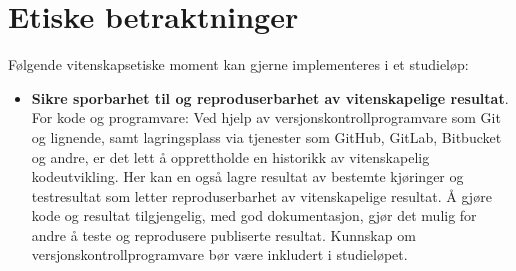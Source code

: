 \documentclass{article}
\begin{document}
\section{Etiske betraktninger}
Følgende vitenskapsetiske moment kan gjerne implementeres i et studieløp:

\begin{itemize}
  \item \textbf{Sikre sporbarhet til og reproduserbarhet av vitenskapelige resultat}. For kode og programvare: Ved hjelp av versjonskontrollprogramvare som Git og lignende, samt lagringsplass via tjenester som GitHub, GitLab, Bitbucket og andre, er det lett å opprettholde en historikk av vitenskapelig kodeutvikling. Her kan en også lagre resultat av bestemte kjøringer og testresultat som letter reproduserbarhet av vitenskapelige resultat. Å gjøre kode og resultat tilgjengelig, med god dokumentasjon, gjør det mulig for andre å teste og reprodusere publiserte resultat. Kunnskap om versjonskontrollprogramvare bør være inkludert i studieløpet.


\end{itemize}
\end{document}
